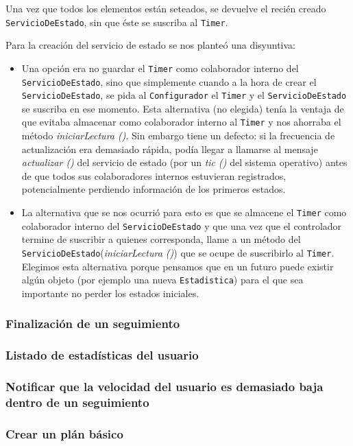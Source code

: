  Una vez que todos los elementos están seteados, se devuelve el recién creado \texttt{ServicioDeEstado}, sin que éste se suscriba al \texttt{Timer}.  


Para la creación del servicio de estado se nos planteó una disyuntiva:
\begin{itemize}
	\item Una opción era no guardar el \texttt{Timer} como colaborador interno del \texttt{ServicioDeEstado}, sino que simplemente cuando a la hora de crear el \texttt{ServicioDeEstado}, se pida al \texttt{Configurador} el \texttt{Timer} y el \texttt{ServicioDeEstado} se suscriba en ese momento. Esta alternativa (no elegida) tenía la ventaja de que evitaba almacenar como colaborador interno al \texttt{Timer} y nos ahorraba el método \emph{iniciarLectura ()}. Sin embargo tiene un defecto: si la frecuencia de actualización era demasiado rápida, podía llegar a llamarse al mensaje \emph{actualizar ()} del servicio de estado (por un \emph{tic ()} del sistema operativo) antes de que todos sus colaboradores internos estuvieran registrados, potencialmente perdiendo información de los primeros estados.
	\item La alternativa que se nos ocurrió para esto es que se almacene el \texttt{Timer} como colaborador interno del \texttt{ServicioDeEstado} y que una vez que el controlador termine de suscribir a quienes corresponda, llame a un método del \texttt{ServicioDeEstado}(\emph{iniciarLectura ()}) que se ocupe de suscribirlo al \texttt{Timer}. Elegimos esta alternativa porque pensamos que en un futuro puede existir algún objeto (por ejemplo una nueva \texttt{Estadistica}) para el que sea importante no perder los estados iniciales. 
\end{itemize}


\subsubsection{Finalización de un seguimiento}
\subsubsection{Listado de estadísticas del usuario}
\subsubsection{Notificar que la velocidad del usuario es demasiado baja dentro de un seguimiento}
\subsubsection{Crear un plán básico}
